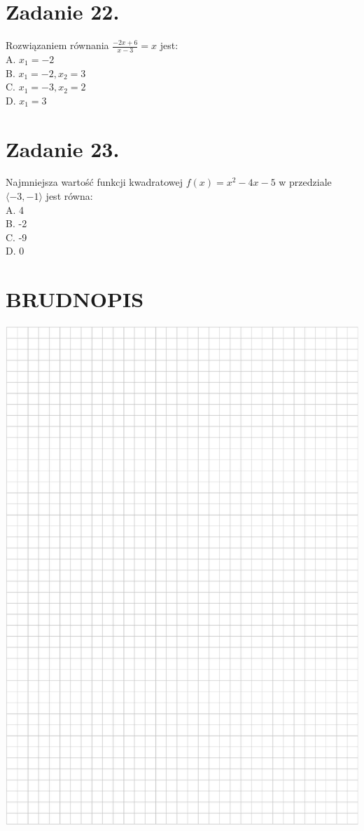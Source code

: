 \documentclass[10pt]{article}
\begin{document}
\section*{Zadanie 22.}
Rozwiązaniem równania \(\frac{-2 x+6}{x-3}=x\) jest:\\
A. \(x_{1}=-2\)\\
B. \(x_{1}=-2, x_{2}=3\)\\
C. \(x_{1}=-3, x_{2}=2\)\\
D. \(x_{1}=3\)

\section*{Zadanie 23.}
Najmniejsza wartość funkcji kwadratowej \(f(x)=x^{2}-4 x-5\) w przedziale \(\langle-3,-1\rangle\) jest równa:\\
A. 4\\
B. -2\\
C. -9\\
D. 0

\section*{BRUDNOPIS}
\begin{center}
\includegraphics[max width=\textwidth]{2024_11_21_94f02db55673a8a7b820g-11}
\end{center}
\end{document}
